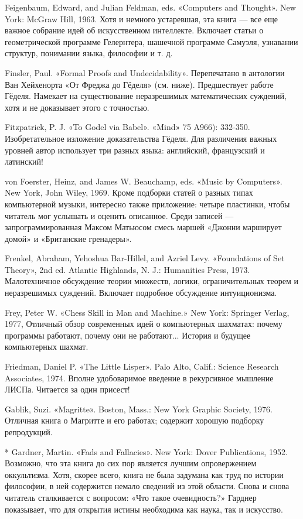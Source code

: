 Feigenbaum, Edward, and Julian Feldman, eds. «Computers and Thought». New York: McGraw Hill, 1963. Хотя и немного устаревшая, эта книга --- все еще важное собрание идей об искусственном интеллекте. Включает статьи о геометрической программе Гелернтера, шашечной программе Самуэля, узнавании структур, понимании языка, философии и т. д.

Finsler, Paul. «Formal Proofs and Undecidability». Перепечатано в антологии Ван Хейхенорта «От Фреджа до Гёделя» (см. ниже). Предшествует работе Гёделя. Намекает на существование неразрешимых математических суждений, хотя и не доказывает этого с точностью.

Fitzpatrick, P. J. «To Godel via Babel». «Mind» 75 A966): 332-350. Изобретательное изложение доказательства Гёделя. Для различения важных уровней автор использует три разных языка: английский, французский и латинский!

von Foerster, Heinz, and James W. Beauchamp, eds. «Music by Computers». New York, John Wiley, 1969. Кроме подборки статей о разных типах компьютерной музыки, интересно также приложение: четыре пластинки, чтобы читатель мог услышать и оценить описанное. Среди записей --- запрограммированная Максом Матьюсом смесь маршей «Джонни марширует домой» и «Британские гренадеры».

Frenkel, Abraham, Yehoshua Bar-Hillel, and Azriel Levy. «Foundations of Set Theory», 2nd ed. Atlantic Highlands, N. J.: Humanities Press, 1973. Малотехничное обсуждение теории множеств, логики, ограничительных теорем и неразрешимых суждений. Включает подробное обсуждение интуиционизма.

Frey, Peter W. «Chess Skill in Man and Machine.» New York: Springer Verlag, 1977, Отличный обзор современных идей о компьютерных шахматах: почему программы работают, почему они не работают... История и будущее компьютерных шахмат.

Friedman, Daniel P. «The Little Lisper». Palo Alto, Calif.: Science Research Associates, 1974. Вполне удобоваримое введение в рекурсивное мышление ЛИСПа. Читается за один присест!

Gablik, Suzi. «Magritte». Boston, Mass.: New York Graphic Society, 1976. Отличная книга о Магритте и его работах; содержит хорошую подборку репродукций.

* Gardner, Martin. «Fads and Fallacies». New York: Dover Publications, 1952. Возможно, что эта книга до сих пор является лучшим опровержением оккультизма. Хотя, скорее всего, книга не была задумана как труд по истории философии, в ней содержится немало сведений из этой области. Снова и снова читатель сталкивается с вопросом: «Что такое очевидность?» Гарднер показывает, что для открытия истины необходима как наука, так и искусство.

